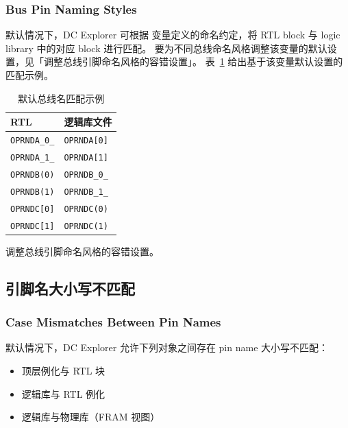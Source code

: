 \subsubsection*{Bus Pin Naming Styles}

默认情况下，DC Explorer 可根据  变量定义的命名约定，将 RTL block 与 logic library 中的对应 block 进行匹配。
要为不同总线命名风格调整该变量的默认设置，见「调整总线引脚命名风格的容错设置」。
表~\ref{tab:bus-match-default} 给出基于该变量默认设置的匹配示例。

\begin{table}[htbp]
\centering
\caption{默认总线名匹配示例}
\label{tab:bus-match-default}
\begin{tabularx}{\textwidth}{@{}X X@{}}
\toprule
\textbf{RTL} & \textbf{逻辑库文件} \\
\midrule
\texttt{OPRNDA\_0\_} & \texttt{OPRNDA[0]} \\
\texttt{OPRNDA\_1\_} & \texttt{OPRNDA[1]} \\
\texttt{OPRNDB(0)} & \texttt{OPRNDB\_0\_} \\
\texttt{OPRNDB(1)} & \texttt{OPRNDB\_1\_} \\
\texttt{OPRNDC[0]} & \texttt{OPRNDC(0)} \\
\texttt{OPRNDC[1]} & \texttt{OPRNDC(1)} \\
\bottomrule
\end{tabularx}
\end{table}

\begin{seeAlsoBox}
调整总线引脚命名风格的容错设置。
\end{seeAlsoBox}

\subsection{引脚名大小写不匹配}
\subsubsection*{Case Mismatches Between Pin Names}

默认情况下，DC Explorer 允许下列对象之间存在 pin name 大小写不匹配：
\begin{itemize}
  \item 顶层例化与 RTL 块
  \item 逻辑库与 RTL 例化
  \item 逻辑库与物理库（FRAM 视图）
\end{itemize}


